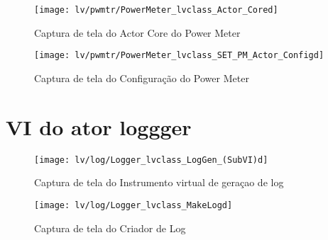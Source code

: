     \begin{figure}
        \centering
        \texttt{[image: lv/pwmtr/PowerMeter\_lvclass\_Actor\_Cored]}
        \caption{Captura de tela do Actor Core do Power Meter}
        \label{fig:pwcore}
    \end{figure}
    \begin{figure}
        \centering
        \texttt{[image: lv/pwmtr/PowerMeter\_lvclass\_SET\_PM\_Actor\_Configd]}
        \caption{Captura de tela do Configuração do Power Meter}
        \label{fig:pwconf}
    \end{figure}
    
\section{VI do ator loggger}

    \begin{comment}
                \begin{figure}
                    \centering
                    \texttt{[image: lv/log/Logger\_lvclass\_Actor\_Cored]}
                    \caption{Captura de tela do Actor Core do Gerador de Log}
                    \label{fig:logcore}
                \end{figure}
                \begin{figure}
                    \centering
                    \texttt{[image: lv/log/Logger\_lvclass\_Configd]}
                    \caption{Captura de tela do Configurador Gerador de Log}
                    \label{fig:logconf}
                \end{figure}
        \end{comment}
            
            
            \begin{figure}
                \centering
                \texttt{[image: lv/log/Logger\_lvclass\_LogGen\_(SubVI)d]}
                \caption{Captura de tela do Instrumento virtual de geraçao de log}
                \label{fig:loggen}
            \end{figure}
            \begin{figure}
                \centering
                \texttt{[image: lv/log/Logger\_lvclass\_MakeLogd]}
                \caption{Captura de tela do Criador  de Log}
                \label{fig:logmake}
            \end{figure}
            
